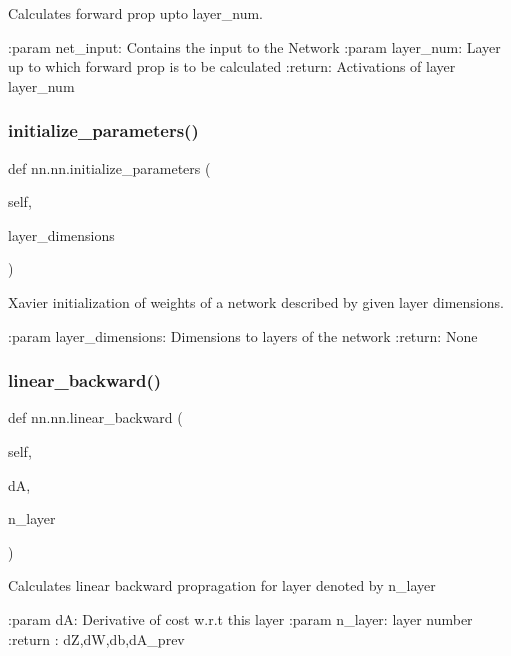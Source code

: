 \begin{DoxyVerb}Calculates forward prop upto layer_num.

:param net_input: Contains the input to the Network
:param layer_num: Layer up to which forward prop is to be calculated
:return: Activations of layer layer_num
\end{DoxyVerb}
 \mbox{\label{classnn_1_1nn_a9821fed1369b4d709fe297fe9e07d97b}} 
\subsubsection{\texorpdfstring{initialize\+\_\+parameters()}{initialize\_parameters()}}
{\footnotesize\ttfamily def nn.\+nn.\+initialize\+\_\+parameters (\begin{DoxyParamCaption}\item[{}]{self,  }\item[{}]{layer\+\_\+dimensions }\end{DoxyParamCaption})}

\begin{DoxyVerb}Xavier initialization of weights of a network described by given layer
dimensions.

:param layer_dimensions: Dimensions to layers of the network
:return: None
\end{DoxyVerb}
 \mbox{\label{classnn_1_1nn_a0863e90359fa30486c7161cd31c5b4e7}} 
\subsubsection{\texorpdfstring{linear\+\_\+backward()}{linear\_backward()}}
{\footnotesize\ttfamily def nn.\+nn.\+linear\+\_\+backward (\begin{DoxyParamCaption}\item[{}]{self,  }\item[{}]{dA,  }\item[{}]{n\+\_\+layer }\end{DoxyParamCaption})}

\begin{DoxyVerb}Calculates linear backward propragation for layer denoted by n_layer

:param dA: Derivative of cost w.r.t this layer
:param n_layer: layer number
:return : dZ,dW,db,dA_prev
\end{DoxyVerb}
 \mbox{\label{classnn_1_1nn_ae74a0f21e8722ea82a0f94135a81a348}} 
